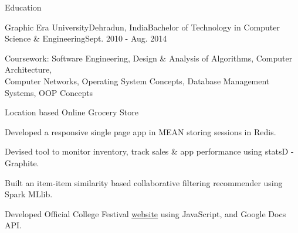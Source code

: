 \documentclass{resume} %
\begin{document}
\begin{rSection}{Education}
\begin{rSubsection}{Graphic Era University}{Dehradun, India}{Bachelor of Technology in Computer Science \& Engineering}{Sept. 2010 - Aug. 2014}
\item Coursework: Software Engineering, Design \& Analysis of Algorithms, Computer Architecture, \\ Computer Networks, Operating System Concepts, Database Management Systems, OOP Concepts
\item Location based Online Grocery Store
\begin{rSubsubsection}
\item Developed a responsive single page app in MEAN storing sessions in Redis.
\item Devised tool to monitor inventory, track sales \& app performance using statsD - Graphite.
\item Built an item-item similarity based collaborative filtering recommender using Spark MLlib.
\end{rSubsubsection}
\item Developed Official College Festival \href{http://iblong2iyush.github.io/grafest}{website} using JavaScript, and Google Docs API.
\end{rSubsection}

\end{rSection}

\end{document}
